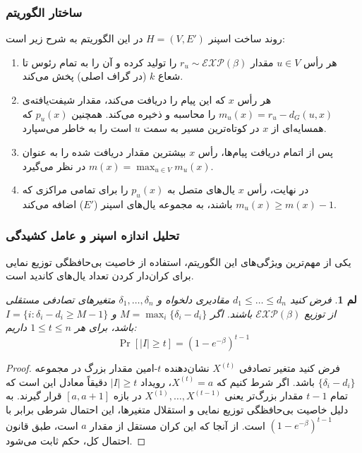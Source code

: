 \documentclass[11pt,a4paper]{report}
\theoremstyle{plain}
\newtheorem{lem}[thm]{\normalsize لم}
\theoremstyle{definition}
\theoremstyle{remark}
\begin{document}
\subsubsection{ساختار الگوریتم}
روند ساخت اسپنر $H = (V,E')$ در این الگوریتم به شرح زیر است:
\begin{enumerate}
    \item هر رأس $u \in V$ مقدار $r_u \sim \mathcal{EXP}(\beta)$ را تولید کرده و آن را به تمام رئوس تا شعاع $k$ (در گراف اصلی) پخش می‌کند.
    \item هر رأس $x$ که این پیام را دریافت می‌کند، مقدار شیفت‌یافته‌ی $m_u(x) = r_u - d_G(u, x)$ را محاسبه و ذخیره می‌کند. همچنین $p_u(x)$ که همسایه‌ای از $x$ در کوتاه‌ترین مسیر به سمت $u$ است را به خاطر می‌سپارد.
    \item پس از اتمام دریافت پیام‌ها، رأس $x$ بیشترین مقدار دریافت شده را به عنوان $m(x) = \max_{u \in V} m_u(x)$ در نظر می‌گیرد.
    \item در نهایت، رأس $x$ یال‌های متصل به $p_u(x)$ را برای تمامی مراکزی که $m_u(x) \ge m(x) - 1$ باشند، به مجموعه یال‌های اسپنر ($E'$) اضافه می‌کند.
\end{enumerate}

\subsubsection{تحلیل اندازه اسپنر و عامل کشیدگی}
یکی از مهم‌ترین ویژگی‌های این الگوریتم، استفاده از خاصیت بی‌حافظگی توزیع نمایی برای کران‌دار کردن تعداد یال‌های کاندید است.

\begin{lem}\label{lem:prob_bound}
فرض کنید $d_1 \le \dots \le d_n$ مقادیری دلخواه و $\delta_1, \dots, \delta_n$ متغیرهای تصادفی مستقلی از توزیع $\mathcal{EXP}(\beta)$ باشند. اگر $M = \max_i\{\delta_i - d_i\}$ و $I = \{i : \delta_i - d_i \ge M - 1\}$ باشد، برای هر $1 \le t \le n$ داریم:
\[ \Pr[|I| \ge t] = (1 - e^{-\beta})^{t-1} \]
\end{lem}
\begin{proof}
فرض کنید متغیر تصادفی $X^{(t)}$ نشان‌دهنده $t$-امین مقدار بزرگ در مجموعه $\{\delta_i - d_i\}$ باشد. اگر شرط کنیم که $X^{(t)} = a$، رویداد $|I| \ge t$ دقیقاً معادل این است که تمام $t-1$ مقدار بزرگ‌تر یعنی $X^{(1)}, \dots, X^{(t-1)}$ در بازه $[a, a+1]$ قرار گیرند. به دلیل خاصیت بی‌حافظگی توزیع نمایی و استقلال متغیرها، این احتمال شرطی برابر با $(1 - e^{-\beta})^{t-1}$ است. از آنجا که این کران مستقل از مقدار $a$ است، طبق قانون احتمال کل، حکم ثابت می‌شود.
\end{proof}
\end{document}

